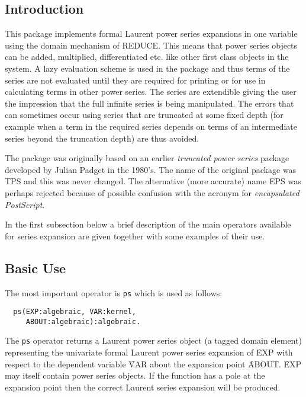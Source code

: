 
 
 
\subsection{Introduction}
This package implements formal Laurent power series expansions in one
variable using the domain mechanism of REDUCE. This means that power
series objects can be added, multiplied, differentiated etc. like other
first class objects in the system. A lazy evaluation scheme is used in
the package and thus terms of the series are not evaluated until they
are required for printing or for use in calculating terms in other
power series. The series are extendible giving the user the impression
that the full infinite series is being manipulated.  The errors that
can sometimes occur using series that are truncated at some fixed depth
(for example when a term in the required series depends on terms of an
intermediate series beyond the truncation depth) are thus avoided.

The package was originally based on an earlier \emph{truncated power series} package
developed by Julian Padget in the 1980's. The name of the original package was
TPS and this was never changed. The alternative (more accurate) name EPS was
perhaps rejected because of possible confusion with the acronym for
\emph{encapsulated PostScript}.

In the first subsection below a brief description of the main operators
available for series expansion are given together with some examples of
their use.

\subsection{Basic Use}
\hypertarget{operator:PS}{}
The most important operator is  \texttt{ps} which is used as follows:
\begin{verbatim}
  ps(EXP:algebraic, VAR:kernel, 
     ABOUT:algebraic):algebraic.
\end{verbatim}

The \texttt{ps} operator returns a Laurent power series object (a tagged domain
element) representing the univariate formal Laurent power series expansion of
\f{EXP} with respect to the dependent variable \f{VAR} about the expansion point
\f{ABOUT}.  \f{EXP} may itself contain power series objects.
If the function has a pole at the expansion point then the correct
Laurent series expansion will be produced.

